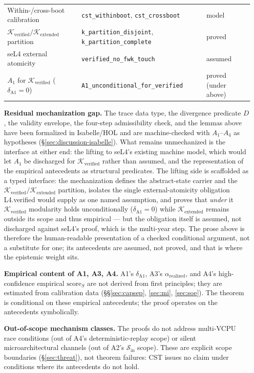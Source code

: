\documentclass[conference]{IEEEtran}
\newcommand{\Kverified}{\mathcal{K}_\text{verified}}
\newcommand{\Kextended}{\mathcal{K}_\text{extended}}
\newcommand{\arealized}{\alpha_\text{realized}}
\newcommand{\scoreS}{\text{score}_S}
\begin{document}
\begin{table}[t]
\begin{tabular}{@{}lll@{}}
Within-/cross-boot calibration & \texttt{cst\_withinboot}, \texttt{cst\_crossboot} & model \\
$\Kverified/\Kextended$ partition & \texttt{k\_partition\_disjoint}, \texttt{k\_partition\_complete} & proved \\
seL4 external atomicity & \texttt{verified\_no\_fwk\_touch} & assumed \\
$A_1$ for $\Kverified$ ($\delta_{\text{A1}}{=}0$) & \texttt{A1\_unconditional\_for\_verified} & proved (under above) \\
\bottomrule
\end{tabular}
\end{table}

\textbf{Residual mechanization gap.} The trace data type, the
divergence predicate $D$, the validity envelope, the four-step
admissibility check, and the lemmas above have been formalized in
Isabelle/HOL and are machine-checked with $A_1$--$A_4$ as
hypotheses (\S\ref{sec:discussion-isabelle}). What remains
unmechanized is the interface at either end: the lifting to seL4's
existing machine model, which would let $A_1$ be discharged for
$\Kverified$ rather than assumed, and the representation of the
empirical antecedents as structural predicates. The lifting side is
scaffolded as a typed interface: the mechanization defines the
abstract-state carrier and the $\Kverified/\Kextended$ partition,
isolates the single external-atomicity obligation L4.verified would
supply as one named assumption, and proves that \emph{under} it
$\Kverified$ modularity holds unconditionally
($\delta_{\text{A1}}{=}0$) while $\Kextended$ remains outside its
scope and thus empirical --- but the obligation itself is assumed,
not discharged against seL4's proof, which is the multi-year step.
The prose above is therefore the human-readable presentation of a
checked conditional argument, not a substitute for one; its
antecedents are assumed, not proved, and that is where the
epistemic weight sits.

\textbf{Empirical content of A1, A3, A4.} A1's
$\delta_{\text{A1}}$, A3's $\arealized$, and A4's
high-confidence empirical $\scoreS$ are not derived from first
principles; they are estimated from calibration data
(\S\S\ref{sec:capsep}, \ref{sec:mi}, \ref{sec:soe}). The theorem
is conditional on these empirical antecedents; the proof
operates on the antecedents symbolically.

\textbf{Out-of-scope mechanism classes.} The proofs do not address
multi-VCPU race conditions (out of A4's deterministic-replay
scope) or silent microarchitectural channels (out of A2's
$\mathcal{S}_\text{in}$ scope). These are explicit scope
boundaries (\S\ref{sec:threat}), not theorem failures: CST
issues no claim under conditions where its antecedents do not
hold.
\end{document}
